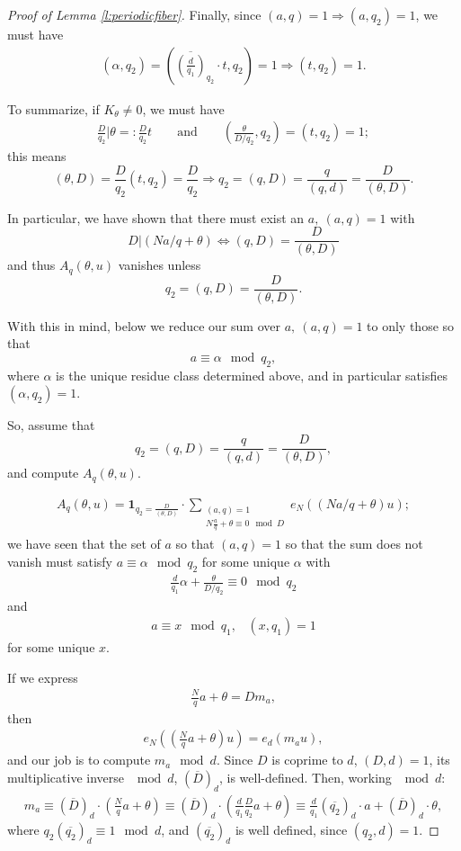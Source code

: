 \documentclass[12pt]{amsart}
\numberwithin{equation}{section}
\theoremstyle{definition}
\begin{document}
\begin{proof}[Proof of Lemma \ref{l:periodicfiber}]
Finally, since $(a,q) = 1 \Rightarrow (a,q_2) = 1$, we must have 
\begin{align}
    (\alpha,q_2) = ( \overline{ (\frac{d}{q_1}) }_{q_2} \cdot  t , q_2) = 1 \Rightarrow (t,q_2) = 1.
\end{align}

To summarize, if $K_\theta \neq 0$, we must have
\begin{align}
\frac{D}{q_2} | \theta =: \frac{D}{q_2} t \qquad \text{and} \qquad ( \frac{\theta}{D/q_2},q_2) = (t,q_2) = 1; \end{align}
this means
\[ (\theta,D) = \frac{D}{q_2}(t,q_2) = \frac{D}{q_2} \Rightarrow q_2 = (q,D) = \frac{q}{(q,d)} = \frac{D}{(\theta,D)}.\]

In particular, we have shown that there must exist an $a, \ (a,q) =1$ with
\[ D | (Na/q + \theta) \iff (q,D) = \frac{D}{(\theta,D)}\]
and thus $A_q(\theta,u)$ vanishes unless
\[ q_2 = (q,D) = \frac{D}{(\theta,D)}.\]

With this in mind, below we reduce our sum over $a, \ (a,q) =1$ to only those so that
\[ a \equiv \alpha \mod q_2,\]
where $\alpha$ is the unique residue class determined above, and in particular satisfies $(\alpha,q_2) =1$.

So, assume that
\[ q_2 = (q,D) = \frac{q}{(q,d)} = \frac{D}{(\theta,D)},\]
and compute $A_q(\theta,u)$.

\begin{align}
    A_q(\theta,u) = \mathbf{1}_{q_2 = \frac{D}{(\theta,D)}} \cdot \sum_{\substack{(a,q) =1 \\ N\frac{a}{q} + \theta \equiv 0 \mod D}} e_N( (Na/q + \theta) u );  
\end{align}
we have seen that the set of $a$ so that $(a,q) =1$ so that the sum does not vanish must satisfy $a \equiv \alpha \mod q_2$ for some unique $\alpha$ with
\begin{align}
    \frac{d}{q_1} \alpha + \frac{\theta}{D/q_2} \equiv 0 \mod q_2
\end{align}
and
\begin{align}
a \equiv x \mod q_1, \; \; \; (x,q_1) = 1    
\end{align}
for some unique $x$.

If we express
\begin{align}
    \frac{N}{q} a + \theta = D m_a,
\end{align}
then
\begin{align}
e_N((\frac{N}{q} a + \theta)u) = e_d(m_au),
\end{align}
and our job is to compute $m_a \mod d$. Since $D$ is coprime to $d$, $(D,d) =1$, its multiplicative inverse $\mod d$, $(\overline{D})_d$, is well-defined. Then, working $\mod d$:
\begin{align}
m_a \equiv (\overline{D})_d \cdot (\frac{N}{q} a + \theta) \equiv (\overline{D})_d \cdot ( \frac{d}{q_1} \frac{D}{q_2} a + \theta)  \equiv \frac{d}{q_1} (\overline{q_2})_d \cdot a + (\overline{D})_d \cdot \theta,
\end{align}
where $q_2 (\overline{q_2})_d \equiv 1 \mod d$, and $(\overline{q_2})_d$ is well defined, since $(q_2,d) = 1$.


\end{proof}
\end{document}
